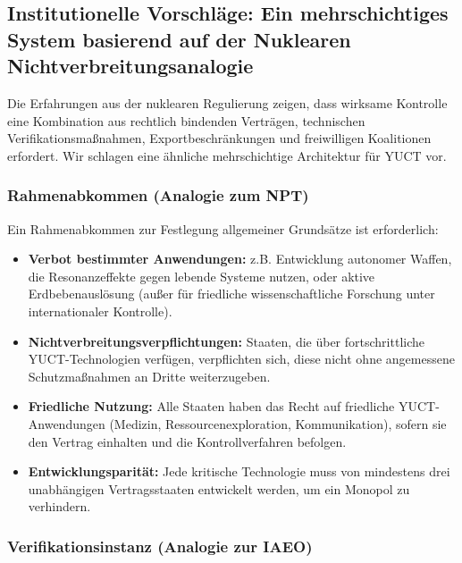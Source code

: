 \documentclass[12pt,a4paper]{article}
\theoremstyle{remark}
\begin{document}
	\subsection{Institutionelle Vorschläge: Ein mehrschichtiges System basierend auf der Nuklearen Nichtverbreitungsanalogie}
	\label{subsec:institutions}
	
	Die Erfahrungen aus der nuklearen Regulierung zeigen, dass wirksame Kontrolle eine Kombination aus rechtlich bindenden Verträgen, technischen Verifikationsmaßnahmen, Exportbeschränkungen und freiwilligen Koalitionen erfordert. Wir schlagen eine ähnliche mehrschichtige Architektur für YUCT vor.
	
	\subsubsection{Rahmenabkommen (Analogie zum NPT)}
	
	Ein Rahmenabkommen zur Festlegung allgemeiner Grundsätze ist erforderlich:
	\begin{itemize}
		\item \textbf{Verbot bestimmter Anwendungen:} z.B. Entwicklung autonomer Waffen, die Resonanzeffekte gegen lebende Systeme nutzen, oder aktive Erdbebenauslösung (außer für friedliche wissenschaftliche Forschung unter internationaler Kontrolle).
		\item \textbf{Nichtverbreitungsverpflichtungen:} Staaten, die über fortschrittliche YUCT-Technologien verfügen, verpflichten sich, diese nicht ohne angemessene Schutzmaßnahmen an Dritte weiterzugeben.
		\item \textbf{Friedliche Nutzung:} Alle Staaten haben das Recht auf friedliche YUCT-Anwendungen (Medizin, Ressourcenexploration, Kommunikation), sofern sie den Vertrag einhalten und die Kontrollverfahren befolgen.
		\item \textbf{Entwicklungsparität:} Jede kritische Technologie muss von mindestens drei unabhängigen Vertragsstaaten entwickelt werden, um ein Monopol zu verhindern.
	\end{itemize}
	
	\subsubsection{Verifikationsinstanz (Analogie zur IAEO)}
	
\end{document}
